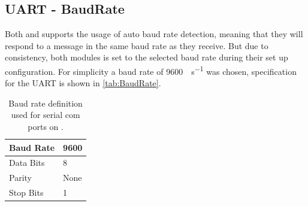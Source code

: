 
\subsection{UART - BaudRate}
Both \SARA and \GPS supports the usage of auto baud rate detection, meaning that they will respond to a message in the same baud rate as they receive.
But due to consistency, both modules is set to the selected baud rate during their set up configuration. 
For simplicity a baud rate of \SI[per-mode = symbol]{9600}{\bit\per\second} was chosen, specification for the UART is shown in \vref{tab:BaudRate}.

\begin{table}[H]
	\begin{tabular}{ll}
		\hline 
		Baud Rate & 9600 \\ 
		\hline 
		Data Bits & 8 \\ 
		\hline 
		Parity & None \\ 
		\hline 
		Stop Bits & 1 \\ 
		\hline 
	\end{tabular}
	\centering
	\caption{Baud rate definition used for serial com ports on \SAMD.}
	\label{tab:BaudRate}
\end{table} 

\FloatBarrier